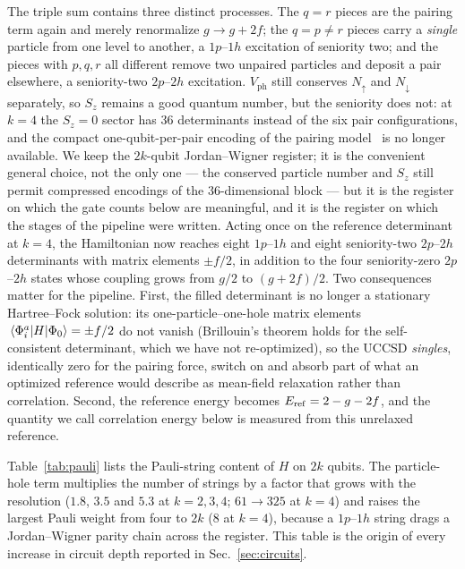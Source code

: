 \documentclass[
  aps,            %
  prc,            %
  reprint,        %
  superscriptaddress,
  floatfix,
  nofootinbib
]{revtex4-2}
\newcommand{\Vph}{V_{\mathrm{ph}}}
\begin{document}
The triple sum contains three distinct processes.  The $q=r$ pieces are the
pairing term again and merely renormalize $g\to g+2f$; the $q=p\neq r$ pieces
carry a \emph{single} particle from one level to another, a $1p$--$1h$
excitation of seniority two; and the pieces with $p,q,r$ all different remove
two unpaired particles and deposit a pair elsewhere, a seniority-two $2p$--$2h$
excitation.  $\Vph$ still conserves $N_\uparrow$ and $N_\downarrow$
separately, so $S_z$ remains a good quantum number, but the seniority does
not: at $k=4$ the $S_z=0$ sector has $36$ determinants instead of the six pair
configurations, and the compact one-qubit-per-pair encoding of the pairing
model~\cite{Lacroix2020,AychetClaisse2026} is no longer available.  We keep
the $2k$-qubit Jordan--Wigner register; it is the convenient general choice,
not the only one --- the conserved particle number and $S_z$ still permit
compressed encodings of the $36$-dimensional block --- but it is the register
on which the gate counts below are meaningful, and it is the register on
which the stages of the pipeline were written.  Acting once on the reference
determinant at $k=4$, the Hamiltonian now reaches eight $1p$--$1h$ and eight
seniority-two $2p$--$2h$ determinants with matrix elements $\pm f/2$, in
addition to the four seniority-zero $2p$--$2h$ states whose coupling grows
from $g/2$ to $(g+2f)/2$.  Two consequences matter for the pipeline.  First,
the filled determinant is no longer a stationary Hartree--Fock solution: its
one-particle--one-hole matrix elements $\mel{\Phi_i^a}{H}{\Phi_0}=\pm f/2$ do
not vanish (Brillouin's theorem holds for the self-consistent determinant,
which we have not re-optimized), so the UCCSD \emph{singles}, identically zero
for the pairing force, switch on and absorb part of what an optimized
reference would describe as mean-field relaxation rather than correlation.
Second, the reference energy becomes $E_{\rm ref}=2-g-2f$, and the quantity
we call correlation energy below is measured from this unrelaxed reference.

Table~\ref{tab:pauli} lists the Pauli-string content of $H$ on $2k$ qubits.
The particle-hole term multiplies the number of strings by a factor that
grows with the resolution ($1.8$, $3.5$ and $5.3$ at $k=2,3,4$; $61\to325$ at
$k=4$) and raises the largest Pauli weight from four to $2k$ ($8$ at $k=4$),
because a $1p$--$1h$ string drags a Jordan--Wigner parity chain across the
register.  This table is the origin of every increase in circuit depth
reported in Sec.~\ref{sec:circuits}.
\end{document}
